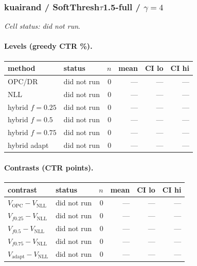 \documentclass[10pt,a4paper]{article}
\begin{document}
\subsubsection{kuairand / SoftThresh$\tau$1.5-full / $\gamma=4$}
\emph{Cell status: did not run}.
\paragraph{Levels (greedy CTR \%).}
{\centering\small\begin{tabular}{llrrrr}
\toprule method & status & $n$ & mean & CI lo & CI hi \\
\midrule
OPC/DR & did not run & 0 & --- & --- & --- \\
NLL & did not run & 0 & --- & --- & --- \\
hybrid $f{=}0.25$ & did not run & 0 & --- & --- & --- \\
hybrid $f{=}0.5$ & did not run & 0 & --- & --- & --- \\
hybrid $f{=}0.75$ & did not run & 0 & --- & --- & --- \\
hybrid adapt & did not run & 0 & --- & --- & --- \\
\bottomrule\end{tabular}\par}
\paragraph{Contrasts (CTR points).}
{\centering\small\begin{tabular}{llrrrr}
\toprule contrast & status & $n$ & mean & CI lo & CI hi \\
\midrule
$V_{\mathrm{OPC}}-V_{\mathrm{NLL}}$ & did not run & 0 & --- & --- & --- \\
$V_{f0.25}-V_{\mathrm{NLL}}$ & did not run & 0 & --- & --- & --- \\
$V_{f0.5}-V_{\mathrm{NLL}}$ & did not run & 0 & --- & --- & --- \\
$V_{f0.75}-V_{\mathrm{NLL}}$ & did not run & 0 & --- & --- & --- \\
$V_{\mathrm{adapt}}-V_{\mathrm{NLL}}$ & did not run & 0 & --- & --- & --- \\
\bottomrule\end{tabular}\par}
\end{document}
